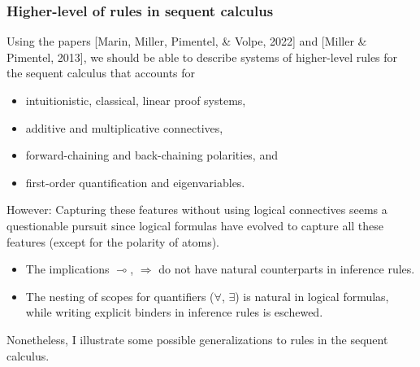 \documentclass[9pt]{beamer}
\begin{document}
\begin{frame}
\frametitle{Higher-level of rules in sequent calculus}

Using the papers [Marin, Miller, Pimentel, \& Volpe, 2022] and [Miller
  \& Pimentel, 2013], we should be able to describe systems of
higher-level rules for the sequent calculus that accounts for
\begin{itemize}
\item intuitionistic, classical, linear proof systems,
\item additive and multiplicative connectives,
\item forward-chaining and back-chaining polarities, and 
\item first-order quantification and eigenvariables.
\end{itemize}
\vfill
\pause

However: Capturing these features without using logical connectives
seems a questionable pursuit since logical formulas have evolved to
capture all these features (except for the polarity of atoms).

\begin{itemize}
\item The implications $\multimap$, $\Rightarrow$ do not 
  have natural counterparts in inference rules.
  
\item The nesting of scopes for quantifiers ($\forall$, $\exists$) is
  natural in logical formulas, while writing explicit binders in
  inference rules is eschewed.
\end{itemize}
\vfill

\pause Nonetheless, I illustrate some possible generalizations to
rules in the sequent calculus.
\end{frame}

\newcommand{\delayop}{\partial}
\newcommand{\negd}[1]{\delayop_{\scriptscriptstyle -}(#1)}
\newcommand{\posd}[1]{\delayop_{\scriptscriptstyle +}(#1)}
\end{document}
